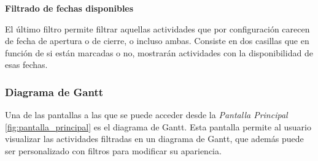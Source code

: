 \textbf{Filtrado de fechas disponibles}

El último filtro permite filtrar aquellas actividades que por configuración carecen de fecha de apertura o de cierre, o incluso ambas. Consiste en dos casillas que en función de si están marcadas o no, mostrarán actividades con la disponibilidad de esas fechas.

\subsubsection{Diagrama de Gantt}
Una de las pantallas a las que se puede acceder desde la \textit{Pantalla Principal} \ref{fig:pantalla_principal} es el diagrama de Gantt. Esta pantalla permite al usuario visualizar las actividades filtradas en un diagrama de Gantt, que además puede ser personalizado con filtros para modificar su apariencia.
